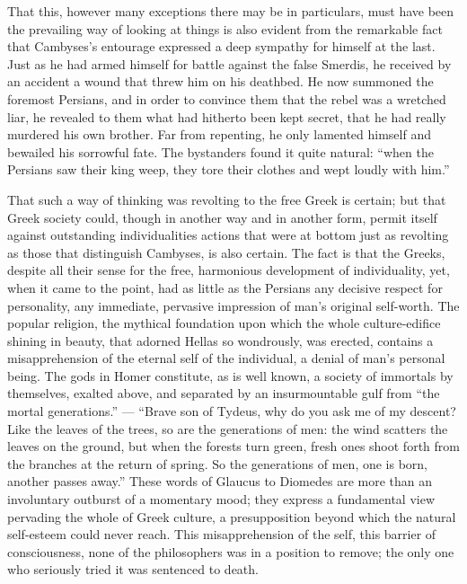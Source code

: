 \documentclass[12pt,a4paper,openany]{book}
\newcommand{\opage}[1]{\marginnote{\footnotesize\textit{[#1]}}}
\begin{document}
That this, however many exceptions there may be
in particulars, must have been the prevailing
way of looking at things is also evident from the remarkable fact
that Cambyses's entourage expressed a deep sympathy
for himself at the last. Just as he had
armed himself for battle against the false Smerdis, he received
by an accident a wound that threw him on
his deathbed. He now summoned the foremost Persians,
and in order to convince them that the rebel was a wretched
liar, he revealed to them what had hitherto been kept
secret, that he had really murdered his own brother.
Far from repenting, he only lamented himself and bewailed
his sorrowful fate. The bystanders found it
quite natural: ``when the Persians saw their king weep,
they tore their clothes and wept loudly with him.''

That such a way of thinking was revolting to the free
Greek is certain; but that Greek society
could, though in another way and in another form, permit itself
against outstanding individualities actions that were at bottom
just as revolting as those that distinguish Cambyses,
is also certain. The fact is that the Greeks, despite all
their sense for the free, harmonious development of individuality,
yet, when it came to the point, had as little as
the Persians any decisive respect for personality,
any immediate, pervasive impression of man's
original self-worth. The popular religion, the mythical
foundation upon which the whole culture-edifice shining in beauty,
that adorned Hellas so wondrously,
\setcounter{footnote}{0}%
\opage{297}was erected, contains a misapprehension of the eternal
self of the individual, a denial of man's personal being.
The gods in Homer constitute, as is well known, a society
of immortals by themselves, exalted above, and separated by an insurmountable
gulf from ``the mortal generations.'' --- ``Brave son
of Tydeus, why do you ask me of my descent? Like
the leaves of the trees, so are the generations of men:
the wind scatters the leaves on the ground, but when the forests
turn green, fresh ones shoot forth from the branches at the
return of spring. So the generations of men, one is born, another
passes away.'' These words of Glaucus to Diomedes are
more than an involuntary outburst of a momentary mood;
they express a fundamental view pervading the whole of
Greek culture, a presupposition beyond which
the natural self-esteem could never reach. This
misapprehension of the self, this barrier of consciousness, none
of the philosophers was in a position to remove; the only one
who seriously tried it was sentenced to death.
\end{document}
